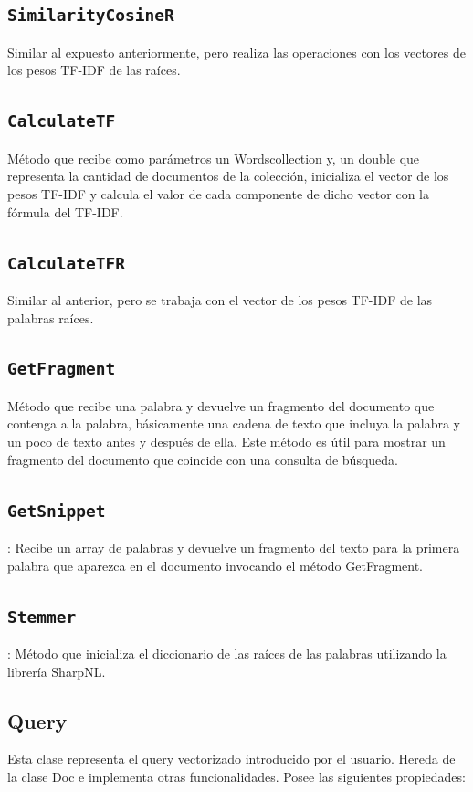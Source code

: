 \documentclass{report}
\newcommand{\csharpproperty}[1]{\textcolor{csharp-property}{\texttt{#1}}}
\begin{document}
\subsection{\csharpproperty{SimilarityCosineR}}
Similar al expuesto anteriormente, pero realiza las operaciones con los vectores de los pesos TF-IDF de las raíces.
\subsection{\csharpproperty{CalculateTF}}
Método que recibe como parámetros un Wordscollection y, un double que representa la cantidad de documentos de la colección, inicializa el vector de los pesos TF-IDF y calcula el valor de cada componente de dicho vector con la fórmula del TF-IDF.
\subsection{\csharpproperty{CalculateTFR}}
Similar al anterior, pero se trabaja con el vector de los pesos TF-IDF de las palabras raíces.
\subsection{\csharpproperty{GetFragment}}
Método que recibe una palabra y devuelve un fragmento del documento que contenga a la palabra, básicamente una cadena de texto que incluya la palabra y un poco de texto antes y después de ella. Este método es útil para mostrar un fragmento del documento que coincide con una consulta de búsqueda.

\subsection{\csharpproperty{GetSnippet}} : Recibe un array de palabras y devuelve un fragmento del texto para la primera palabra que 
aparezca en el documento invocando el método GetFragment.
\subsection{\csharpproperty{Stemmer}} : Método que inicializa el diccionario de las raíces de las palabras utilizando la librería 
SharpNL.

\subsection{\csharpproperty\LARGE{Query}}
Esta clase representa el query vectorizado introducido por el usuario. Hereda de la clase Doc e 
implementa otras funcionalidades.
Posee las siguientes propiedades:
\end{document}
